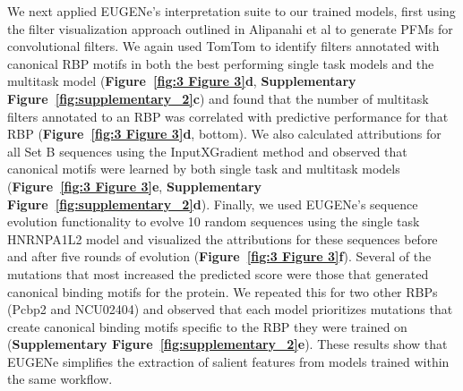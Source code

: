 We next applied EUGENe’s interpretation suite to our trained models, first using the filter visualization approach outlined in Alipanahi et al to generate PFMs for convolutional filters. We again used TomTom to identify filters annotated with canonical RBP motifs\cite{Ray2013-yd} in both the best performing single task models and the multitask model (\textbf{Figure~\ref{fig:3 Figure 3}d}, \textbf{Supplementary Figure~\ref{fig:supplementary_2}c}) and found that the number of multitask filters annotated to an RBP was correlated with predictive performance for that RBP (\textbf{Figure~\ref{fig:3 Figure 3}d}, bottom). We also calculated attributions for all Set B sequences using the InputXGradient method\cite{Shrikumar2016-lf} and observed that canonical motifs were learned by both single task and multitask models (\textbf{Figure~\ref{fig:3 Figure 3}e}, \textbf{Supplementary Figure~\ref{fig:supplementary_2}d}). Finally, we used EUGENe’s sequence evolution functionality to evolve 10 random sequences using the single task HNRNPA1L2 model and visualized the attributions for these sequences before and after five rounds of evolution (\textbf{Figure~\ref{fig:3 Figure 3}f}). Several of the mutations that most increased the predicted score were those that generated canonical binding motifs for the protein. We repeated this for two other RBPs (Pcbp2 and NCU02404) and observed that each model prioritizes mutations that create canonical binding motifs specific to the RBP they were trained on (\textbf{Supplementary Figure~\ref{fig:supplementary_2}e}). These results show that EUGENe simplifies the extraction of salient features from models trained within the same workflow.

